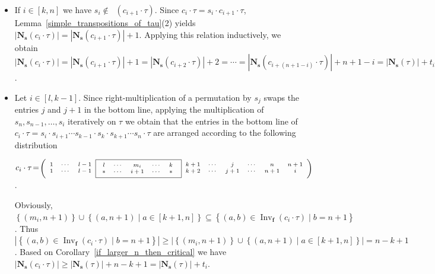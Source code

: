 \documentclass[a4 paper,12pt]{article}
\DeclareMathOperator{\Inv}{Inv}
\DeclareMathOperator{\Red}{R_{\textbf{d}}}
\begin{document}
\begin{itemize}
	\item If $i\in \left[k,n\right]$ we have  $s_i\not\in \Red(c_{i+1}\cdot \tau)$. Since $c_{i}\cdot  \tau = s_i\cdot c_{i+1}\cdot  \tau$,  Lemma~\ref{simple_transpositions_of_tau}(2) yields 
 $\left|\textbf{N}_{\textbf{s}}(c_{i}\cdot  \tau)\right| = \left|\textbf{N}_{\textbf{s}}(c_{i+1}\cdot  \tau)\right| +1$. 
Applying this relation inductively, we obtain  $\left|\textbf{N}_{\textbf{s}}(c_{i}\cdot  \tau)\right| =\left|\textbf{N}_{\textbf{s}}( c_{i+1}\cdot\tau)\right| +1 = \left|\textbf{N}_{\textbf{s}}( c_{i+2}\cdot\tau)\right| +2 = \cdots = \left|\textbf{N}_{\textbf{s}}( c_{i +(n+1-i)}\cdot\tau)\right| +n+1-i = \left|\textbf{N}_{\textbf{s}}( \tau)\right|  +t_i$. 

	
	\item Let $i\in \left[l,k-1\right]$.  Since right-multiplication of a permutation by $s_j$ swaps the entries $j$ and $j+1$ in the bottom line, applying the multiplication of $s_n, s_{n-1}, \dots, s_i$ iteratively on $\tau $ we obtain that the entries in the bottom line of $c_i \cdot \tau = s_i\cdot s_{i+1}  \cdots s_{k-1}\cdot s_{k}\cdot s_{k+1} \cdots s_{n}\cdot \tau $  are arranged according to the following distribution
\begin{center}
$c_{i}\cdot\tau\!=\! \begin{scriptsize}\Bigg(
\begin{array}{ccc}
	1 & \cdots & l -1 \\
	1&\cdots&  l -1
\end{array}
\framebox{$
\begin{array}{ccccc}
	l& \cdots &m_i&\cdots &k  \\
	\ast & \cdots & i+1&\cdots& \ast 
\end{array}$
}
\begin{array}{ccccc}
	k+1 &  \cdots &j&   \cdots & n\\
	k+2 &  \cdots &j+1&  \cdots & n+1
\end{array}\begin{array}{c}
	n+1\\
	 i
\end{array}\Bigg)\end{scriptsize}$.
\end{center}
Obviously,  $\left\{(m_i, n+1)\right\}\cup \left\{ (a,n+1) \mid  a\in \left[k+1,n\right]\right\} 
\subseteq \left\{(a,b)\in \Inv_{\textbf{f}}(c_i\cdot\tau) \mid b=n+1\right\}$. Thus $\left|\left\{(a,b)\in \Inv_{\textbf{f}}(c_i\cdot\tau) \mid b=n+1\right\}\right| \geq \left|\left\{(m_i, n+1)\right\}\cup \left\{ (a,n+1) \mid  a\in \left[k+1,n\right]\right\} \right| = n-k+1$. Based on Corollary~\ref{if_larger_n_then_critical} we have 
$\left|\textbf{N}_{\textbf{s}}(c_i\cdot \tau)\right| \geq   \left|\textbf{N}_{\textbf{s}}( \tau)\right| +n-k+1 = \left|\textbf{N}_{\textbf{s}}( \tau)\right| +t_i$.


\end{itemize}
\end{document}

